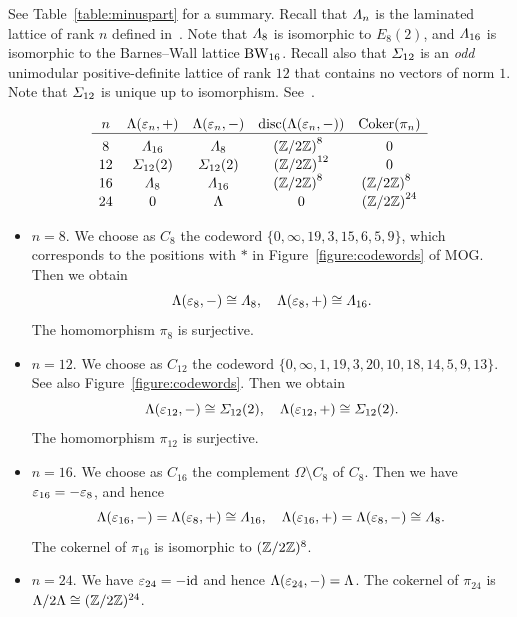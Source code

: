 \documentclass{amsart} %
\begin{document}
 See Table~\ref{table:minuspart} for a summary.
 Recall that $\varLambda_{n}$ is 
 the laminated lattice of rank $n$
 defined in~\cite[Figure 6.2]{theCSbook}.
 Note that $\varLambda_8$
is isomorphic to $E_8(2)$,
and $\varLambda_{16}$ is 
isomorphic to the Barnes--Wall lattice $\mathrm{BW}_{16}$.
 Recall also that
$\varSigma_{12}$ is an \emph{odd} unimodular positive-definite lattice of rank $12$
that contains no vectors of norm $1$.
Note that $\varSigma_{12}$ is unique up to isomorphism.
See~\cite[Table 16.7]{theCSbook}.
%
\begin{table}
\[
\begin{array}{ccccc}
n & \Leech(\vep_n, +)& \Leech(\vep_n, -) & \disc(\Leech(\vep_n, -)) & \Coker (\pi_n) \\
\hline
8 & \Lamsxtn & \Laminated_{8} & {(\ZZ/2\ZZ)}^{8\;\;} & 0 \mystruth{12pt}\\
12 & \Sigmatwlv(2) & \Sigmatwlv(2) & {(\ZZ/2\ZZ)}^{12} & 0 \\
16 & \Laminated_{8} & \Lamsxtn & {(\ZZ/2\ZZ)}^{8\;\;} &{(\ZZ/2\ZZ)}^{8\;\;} \\
24& 0 & \Leech &0 &{(\ZZ/2\ZZ)}^{24} \\
\end{array}
\]
\caption{$\Leech(\vep_n, +)$ and $\Leech(\vep_n, -)$}\label{table:minuspart}
\end{table}
%
\begin{itemize}
%
\item $n=8$. 
We choose as $C_{8}$ the codeword 
$\{ 0,\infty, 19, 3, 15, 6, 5, 9\} $, 
which corresponds to 
the positions with $*$ in Figure~\ref{figure:codewords} of MOG.
Then we obtain 
\[
\Lambda(\varepsilon_8, -)\cong \varLambda_{8},
\quad 
\Lambda(\varepsilon_8, +)\cong \varLambda_{16}.
\]
The homomorphism $\pi_{8}$ is surjective.
%
\item $n=12$. 
We choose as $C_{12}$ the codeword 
$\{ 0,\infty, 1,19, 3, 20,10, 18, 14, 5, 9, 13\}$.
See also Figure~\ref{figure:codewords}.
Then we obtain 
\[
\Lambda(\varepsilon_{12}, -)\cong \varSigma_{12}(2),
\quad 
\Lambda(\varepsilon_{12}, +)\cong \varSigma_{12}(2).
\]
The homomorphism $\pi_{12}$ is surjective.
%
\item $n=16$. 
We choose as $C_{16}$ the complement $\Omega\setminus C_8$ of $C_8$. 
Then we have $\varepsilon_{16}=-\varepsilon_{8}$, and hence 
\[
\Lambda(\varepsilon_{16}, -)=\Lambda(\varepsilon_{8}, +)\cong \varLambda_{16},
\quad 
\Lambda(\varepsilon_{16}, +)=\Lambda(\varepsilon_8, -)\cong \varLambda_{8}.
\]
%
The cokernel of $\pi_{16}$ is isomorphic to $(\mathord{\mathbb{Z}}/2\mathord{\mathbb{Z}})^8$.
%
\item $n=24$. We have $\varepsilon_{24}=-\mathord{\mathrm{id}}$ and hence 
$\Lambda(\varepsilon_{24}, -)=\Lambda$.
The cokernel of $\pi_{24}$ is $\Lambda/2\Lambda \cong (\mathord{\mathbb{Z}}/2\mathord{\mathbb{Z}})^{24}$.
\end{itemize}
\end{document}
